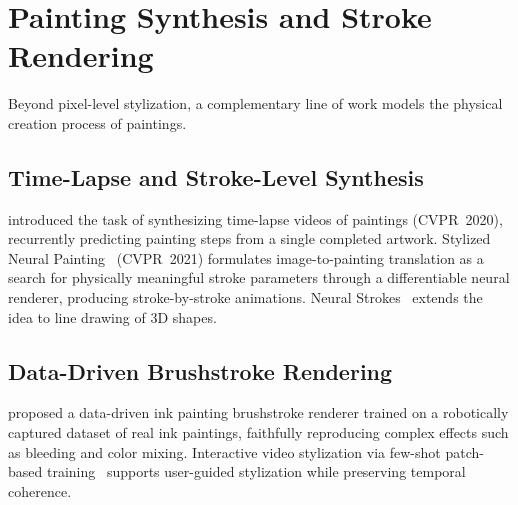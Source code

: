 \section{Painting Synthesis and Stroke Rendering}
\label{sec:painting}

Beyond pixel-level stylization, a complementary line of work models the physical creation
process of paintings.

\subsection{Time-Lapse and Stroke-Level Synthesis}

\citet{zhao2020painting} introduced the task of synthesizing time-lapse videos of
paintings (CVPR~2020), recurrently predicting painting steps from a single completed
artwork. Stylized Neural Painting~\cite{zou2021stylized} (CVPR~2021) formulates
image-to-painting translation as a search for physically meaningful stroke parameters
through a differentiable neural renderer, producing stroke-by-stroke animations.
Neural Strokes~\cite{liu2021neuralstrokes} extends the idea to line drawing of 3D shapes.

\subsection{Data-Driven Brushstroke Rendering}

\citet{madono2023data} proposed a data-driven ink painting brushstroke renderer trained
on a robotically captured dataset of real ink paintings, faithfully reproducing complex
effects such as bleeding and color mixing. Interactive video stylization via few-shot
patch-based training~\cite{texler2020interactive} supports user-guided stylization while
preserving temporal coherence.
